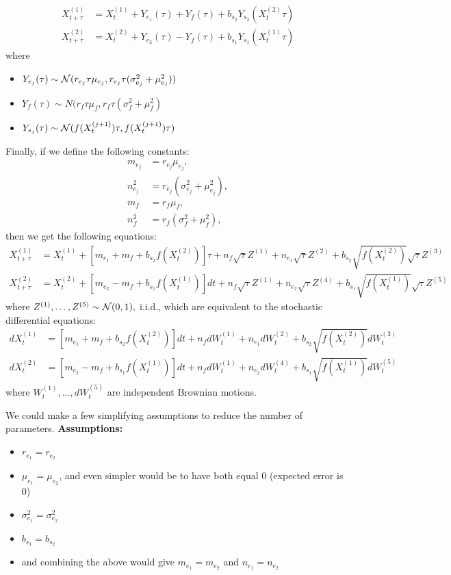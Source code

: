 \documentclass{article}
\begin{document}
\begin{align*}
X_{t+\tau}^{(1)}&=X_t^{(1)}+Y_{e_1}(\tau)+Y_f(\tau)+b_{s_2}Y_{s_2}(X_t^{(2)}\tau)
\\ X_{t+\tau}^{(2)}&=X_t^{(2)}+Y_{e_2}(\tau)-Y_f(\tau)+b_{s_1}Y_{s_1}(X_t^{(1)}\tau)
\end{align*}
where 
\begin{itemize}
\item $Y_{e_j}(\tau)\sim{\mathcal{ N}}(r_{e_j}\tau\mu_{e_j},r_{e_j}\tau(\sigma_{e_j}^2+\mu_{e_j}^2))$

\item $Y_f(\tau)\sim N(r_f\tau\mu_f,r_f\tau(\sigma^2_f+\mu_f^2)$

\item $Y_{s_j}(\tau)\sim{\mathcal{ N}}(f(X_t^{(j+1)})\tau,f(X_t^{(j+1)})\tau)$

\end{itemize}
Finally, if we define the following constants:
\begin{align*}
m_{e_j}&=r_{e_j}\mu_{e_j},
\\ n_{e_j}^2&=r_{e_j}(\sigma_{e_j}^2+\mu_{e_j}^2),
\\ m_f&=r_f\mu_f,
\\ n_f^2&=r_f(\sigma_f^2+\mu_f^2),
\end{align*}
then we get the following equations:
\begin{align*}
X_{t+\tau}^{(1)}&=X_t^{(1)}+\left[m_{e_1}+m_f+b_{s_2}f(X_t^{(2)})\right]\tau+n_f\sqrt{\tau}Z^{(1)}+n_{e_1}\sqrt{\tau}Z^{(2)}+b_{s_2}\sqrt{f(X_t^{(2)})}\sqrt{\tau}Z^{(3)}
\\ X_{t+\tau}^{(2)}&=X_t^{(2)}+\left[m_{e_2}-m_f+b_{s_1}f(X_t^{(1)})\right]dt+n_f\sqrt{\tau}Z^{(1)}+n_{e_2}\sqrt{\tau}Z^{(4)}+b_{s_1}\sqrt{f(X_t^{(1)})}\sqrt{\tau}Z^{(5)}
\end{align*}
where $Z^{(1)},\dots,Z^{(5)}\sim {\mathcal{ N}}(0,1),$ i.i.d., which are equivalent to the stochastic differential equations:
\begin{align*}
dX_t^{(1)}&=\left[m_{e_1}+m_f+b_{s_2}f(X_t^{(2)})\right]dt+n_fdW_t^{(1)}+n_{e_1}dW_t^{(2)}+b_{s_2}\sqrt{f(X_t^{(2)})}dW_t^{(3)}
\\ dX_t^{(2)}&=\left[m_{e_2}-m_f+b_{s_1}f(X_t^{(1)})\right]dt+n_fdW_t^{(1)}+n_{e_2}dW_t^{(4)}+b_{s_1}\sqrt{f(X_t^{(1)})}dW_t^{(5)}
\end{align*}
where $W_t^{(1)},\dots,dW_t^{(5)}$ are independent Brownian motions.

We could make a few simplifying assumptions to reduce the number of parameters.  {\bf Assumptions:}
\begin{itemize}
\item $r_{e_1}=r_{e_2}$
\item $\mu_{e_1}=\mu_{e_2}$, and even simpler would be to have both equal $0$ (expected error is $0$)
\item $\sigma^2_{e_1}=\sigma^2_{e_2}$
\item $b_{s_1}=b_{s_2}$ 
\item and combining the above would give $m_{e_1}=m_{e_2}$ and $n_{e_1}=n_{e_2}$
\end{itemize}
\end{document}
